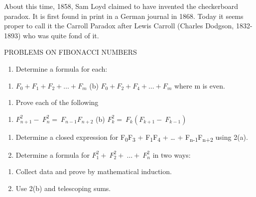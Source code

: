 \documentclass[10pt,letter]{article}
\begin{document}
About this time, 1858, Sam Loyd claimed to have invented the
checkerboard paradox. It is first found in print in a German journal in
1868. Today it seems proper to call it the Carroll Paradox after Lewis
Carroll (Charles Dodgson, 1832-1893) who was quite fond of it.

PROBLEMS ON FIBONACCI NUMBERS
\begin{enumerate}
\def\labelenumi{\arabic{enumi}.}

\item
  Determine a formula for each:

\end{enumerate}
\begin{enumerate}
\def\labelenumi{(\alph{enumi})}

\item
  \(F_{0} + F_{1} + F_{2} + \ldots + F_{m}\) (b)
  \(F_{0} + F_{2} + F_{4} + \ldots + F_{m}\) where m is even.

\end{enumerate}
\begin{enumerate}
\def\labelenumi{\arabic{enumi}.}

\item
  Prove each of the following

\end{enumerate}
\begin{enumerate}
\def\labelenumi{(\alph{enumi})}

\item
  \(F_{n + 1}^{2} - \ F_{n}^{2} = \ F_{n - 1}F_{n + 2}\) (b)
  \(F_{k}^{2} = \ F_{k}(F_{k + 1} - \ F_{k - 1})\)

\end{enumerate}
\begin{enumerate}
\def\labelenumi{\arabic{enumi}.}

\item
  Determine a closed expression for F\textsubscript{0}F\textsubscript{3}
  + F\textsubscript{1}F\textsubscript{4} + \ldots{} +
  F\textsubscript{n-1}F\textsubscript{n+2} using 2(a).
\item
  Determine a formula for
  \(F_{1}^{2} + \ F_{2}^{2} + \ \ldots + \ F_{n}^{2}\) in two ways:

\end{enumerate}
\begin{enumerate}
\def\labelenumi{(\alph{enumi})}

\item
  Collect data and prove by mathematical induction.
\item
  Use 2(b) and telescoping sums.

\end{enumerate}
\end{document}

